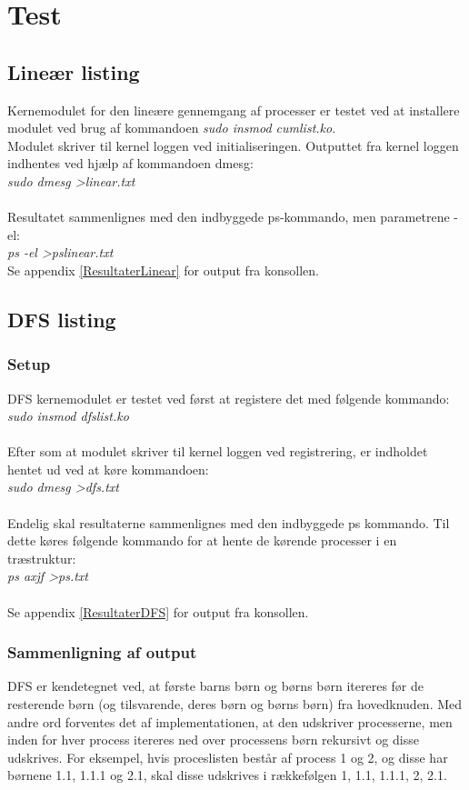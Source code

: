 \chapter{Test}
\section{Lineær listing}
Kernemodulet for den lineære gennemgang af processer er testet ved at installere modulet ved brug af kommandoen \textit{sudo insmod cumlist.ko}.
\\
Modulet skriver til kernel loggen ved initialiseringen. Outputtet fra kernel loggen indhentes ved hjælp af kommandoen dmesg:\\
\textit{sudo dmesg \textgreater linear.txt}
\\
\\
Resultatet sammenlignes med den indbyggede ps-kommando, men parametrene -el:\\
\textit{ps -el \textgreater pslinear.txt}
\\
Se appendix \ref{ResultaterLinear} for output fra konsollen.
\section{DFS listing}
\subsection{Setup}
DFS kernemodulet er testet ved først at registere det med følgende kommando:\\
\textit{sudo insmod dfslist.ko}
\\
\\
Efter som at modulet skriver til kernel loggen ved registrering, er indholdet hentet ud ved at køre kommandoen:\\
\textit{sudo dmesg \textgreater dfs.txt}
\\
\\
Endelig skal resultaterne sammenlignes med den indbyggede ps kommando. Til dette køres følgende kommando for at hente de kørende processer i en træstruktur:\\
\textit{ps axjf \textgreater ps.txt}
\\
\\
Se appendix \ref{ResultaterDFS} for output fra konsollen.

\subsection{Sammenligning af output}
DFS er kendetegnet ved, at første barns børn og børns børn itereres før de resterende børn (og tilsvarende, deres børn og børns børn) fra hovedknuden. Med andre ord forventes det af implementationen, at den udskriver processerne, men inden for hver process itereres ned over processens børn rekursivt og disse udskrives. For eksempel, hvis proceslisten består af process 1 og 2, og disse har børnene 1.1, 1.1.1 og 2.1, skal disse udskrives i rækkefølgen 1, 1.1, 1.1.1, 2, 2.1.\\

